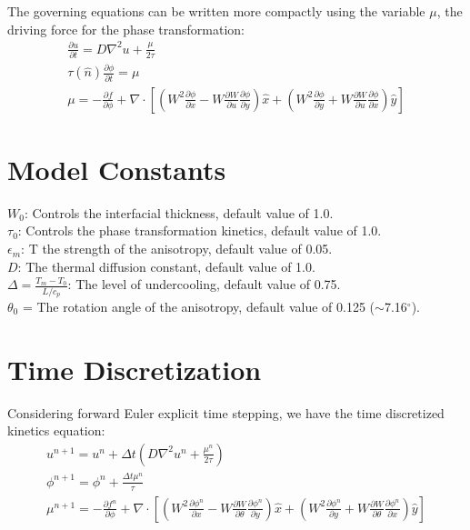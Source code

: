\documentclass[10pt]{article}
\begin{document}
The governing equations can be written more compactly using the variable $\mu$, the driving force for the phase transformation:
\begin{gather}
\frac{\partial u}{\partial t} = D \nabla^2 u + \frac{\mu}{2 \tau} \\
\tau(\hat{n}) \frac{\partial \phi}{\partial t} = \mu \\
\mu = -\frac{\partial f}{\partial \phi} + \nabla \cdot \left[\left(W^2 \frac{\partial \phi}{\partial x} - W \frac{\partial W}{\partial u} \frac{\partial \phi}{\partial y}\right)\hat{x}  + \left(W^2 \frac{\partial \phi}{\partial y} + W \frac{\partial W}{\partial u} \frac{\partial \phi}{\partial x}\right) \hat{y} \right]
\end{gather}

\section{Model Constants}
$W_0$: Controls the interfacial thickness, default value of 1.0. \\
$\tau_0$: Controls the phase transformation kinetics, default value of 1.0. \\
$\epsilon_m$: T the strength of the anisotropy, default value of 0.05. \\
$D$: The thermal diffusion constant, default value of 1.0. \\
$\Delta = \frac{T_m-T_0}{L/c_p}$: The level of undercooling, default value of 0.75. \\
$\theta_0$ = The rotation angle of the anisotropy, default value of 0.125 ($\sim$7.16$^\circ$).

\section{Time Discretization}
Considering forward Euler explicit time stepping, we have the time discretized kinetics equation:
\begin{gather}
u^{n+1} = u^{n} + \Delta t \left( D  \nabla^2 u^n + \frac{\mu^n}{2 \tau} \right) \\
\phi^{n+1} = \phi^n + \frac{\Delta t \mu^n}{\tau} \\
 \mu^{n+1} = -\frac{\partial f^n}{\partial \phi} + \nabla \cdot \left[\left(W^2 \frac{\partial \phi^n}{\partial x} - W \frac{\partial W}{\partial \theta} \frac{\partial \phi^n}{\partial y}\right)\hat{x}  + \left(W^2 \frac{\partial \phi^n}{\partial y} + W \frac{\partial W}{\partial \theta} \frac{\partial \phi^n}{\partial x}\right) \hat{y} \right]
\end{gather}
\end{document}
